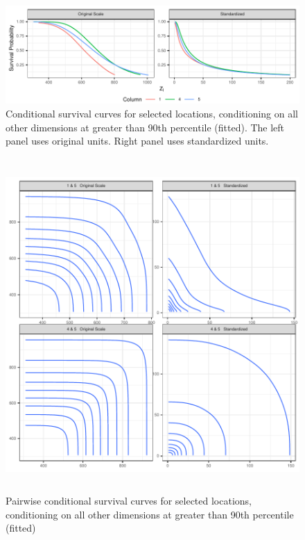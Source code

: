 \begin{figure}[ht]
    \centering
    \caption{Conditional survival curves for selected locations, conditioning on all other dimensions at greater than 90th percentile (fitted)\label{fig:condsurv1d}. The left panel uses original units. Right panel uses standardized units.}
    \includegraphics{./images/condsurv_1d}
\end{figure}

\begin{figure}[htb]
    \centering
    \caption{Pairwise conditional survival curves for selected locations, conditioning on all other dimensions at greater than 90th percentile (fitted)\label{fig:condsurv2d}}
    \includegraphics[height=5in, width=5in]{./images/condsurv_2d}
\end{figure}

